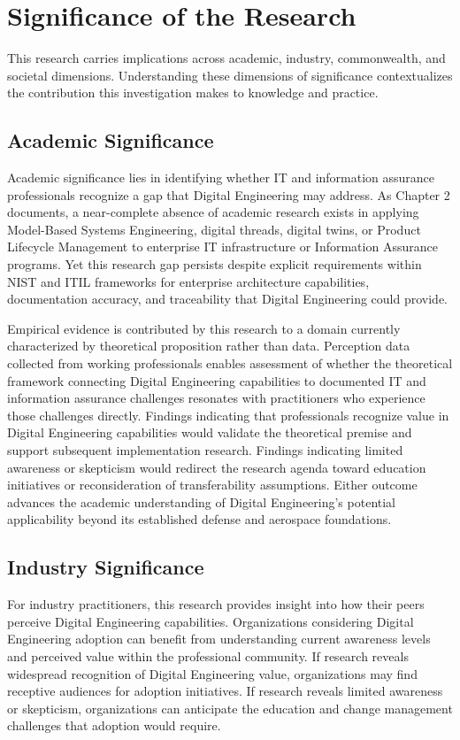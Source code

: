 \section{Significance of the Research}

This research carries implications across academic, industry, commonwealth, and societal dimensions. Understanding these dimensions of significance contextualizes the contribution this investigation makes to knowledge and practice.

\subsection{Academic Significance}

Academic significance lies in identifying whether IT and information assurance professionals recognize a gap that Digital Engineering may address. As Chapter 2 documents, a near-complete absence of academic research exists in applying Model-Based Systems Engineering, digital threads, digital twins, or Product Lifecycle Management to enterprise IT infrastructure or Information Assurance programs. Yet this research gap persists despite explicit requirements within NIST and ITIL frameworks for enterprise architecture capabilities, documentation accuracy, and traceability that Digital Engineering could provide.

Empirical evidence is contributed by this research to a domain currently characterized by theoretical proposition rather than data. Perception data collected from working professionals enables assessment of whether the theoretical framework connecting Digital Engineering capabilities to documented IT and information assurance challenges resonates with practitioners who experience those challenges directly. Findings indicating that professionals recognize value in Digital Engineering capabilities would validate the theoretical premise and support subsequent implementation research. Findings indicating limited awareness or skepticism would redirect the research agenda toward education initiatives or reconsideration of transferability assumptions. Either outcome advances the academic understanding of Digital Engineering's potential applicability beyond its established defense and aerospace foundations.

\subsection{Industry Significance}

For industry practitioners, this research provides insight into how their peers perceive Digital Engineering capabilities. Organizations considering Digital Engineering adoption can benefit from understanding current awareness levels and perceived value within the professional community. If research reveals widespread recognition of Digital Engineering value, organizations may find receptive audiences for adoption initiatives. If research reveals limited awareness or skepticism, organizations can anticipate the education and change management challenges that adoption would require.

